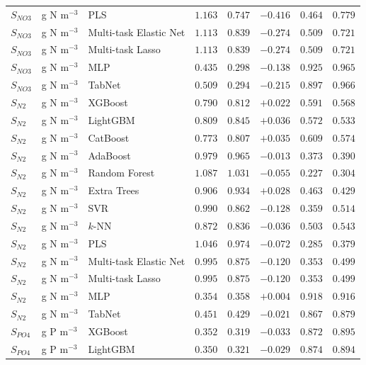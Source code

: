 \begin{longtable}{llp{3.1cm}rrrrr}
$S_{NO3}$ & g N m$^{-3}$ & PLS & $1.163$ & $0.747$ & $-0.416$ & $0.464$ & $0.779$ \\
$S_{NO3}$ & g N m$^{-3}$ & Multi-task Elastic Net & $1.113$ & $0.839$ & $-0.274$ & $0.509$ & $0.721$ \\
$S_{NO3}$ & g N m$^{-3}$ & Multi-task Lasso & $1.113$ & $0.839$ & $-0.274$ & $0.509$ & $0.721$ \\
$S_{NO3}$ & g N m$^{-3}$ & MLP & $0.435$ & $0.298$ & $-0.138$ & $0.925$ & $0.965$ \\
$S_{NO3}$ & g N m$^{-3}$ & TabNet & $0.509$ & $0.294$ & $-0.215$ & $0.897$ & $0.966$ \\
$S_{N2}$ & g N m$^{-3}$ & XGBoost & $0.790$ & $0.812$ & $+0.022$ & $0.591$ & $0.568$ \\
$S_{N2}$ & g N m$^{-3}$ & LightGBM & $0.809$ & $0.845$ & $+0.036$ & $0.572$ & $0.533$ \\
$S_{N2}$ & g N m$^{-3}$ & CatBoost & $0.773$ & $0.807$ & $+0.035$ & $0.609$ & $0.574$ \\
$S_{N2}$ & g N m$^{-3}$ & AdaBoost & $0.979$ & $0.965$ & $-0.013$ & $0.373$ & $0.390$ \\
$S_{N2}$ & g N m$^{-3}$ & Random Forest & $1.087$ & $1.031$ & $-0.055$ & $0.227$ & $0.304$ \\
$S_{N2}$ & g N m$^{-3}$ & Extra Trees & $0.906$ & $0.934$ & $+0.028$ & $0.463$ & $0.429$ \\
$S_{N2}$ & g N m$^{-3}$ & SVR & $0.990$ & $0.862$ & $-0.128$ & $0.359$ & $0.514$ \\
$S_{N2}$ & g N m$^{-3}$ & $k$-NN & $0.872$ & $0.836$ & $-0.036$ & $0.503$ & $0.543$ \\
$S_{N2}$ & g N m$^{-3}$ & PLS & $1.046$ & $0.974$ & $-0.072$ & $0.285$ & $0.379$ \\
$S_{N2}$ & g N m$^{-3}$ & Multi-task Elastic Net & $0.995$ & $0.875$ & $-0.120$ & $0.353$ & $0.499$ \\
$S_{N2}$ & g N m$^{-3}$ & Multi-task Lasso & $0.995$ & $0.875$ & $-0.120$ & $0.353$ & $0.499$ \\
$S_{N2}$ & g N m$^{-3}$ & MLP & $0.354$ & $0.358$ & $+0.004$ & $0.918$ & $0.916$ \\
$S_{N2}$ & g N m$^{-3}$ & TabNet & $0.451$ & $0.429$ & $-0.021$ & $0.867$ & $0.879$ \\
$S_{PO4}$ & g P m$^{-3}$ & XGBoost & $0.352$ & $0.319$ & $-0.033$ & $0.872$ & $0.895$ \\
$S_{PO4}$ & g P m$^{-3}$ & LightGBM & $0.350$ & $0.321$ & $-0.029$ & $0.874$ & $0.894$ \\

\end{longtable}
